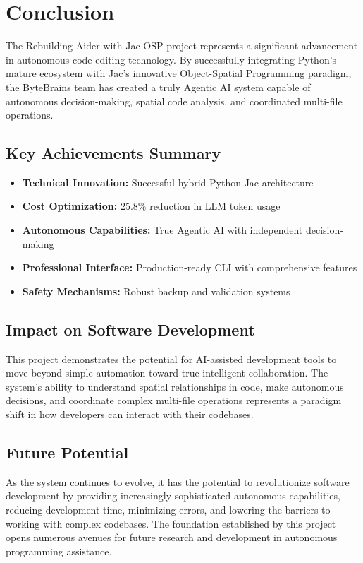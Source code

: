 \documentclass[12pt,a4paper]{article}
\begin{document}
\section{Conclusion}

The Rebuilding Aider with Jac-OSP project represents a significant advancement in autonomous code editing technology. By successfully integrating Python's mature ecosystem with Jac's innovative Object-Spatial Programming paradigm, the ByteBrains team has created a truly Agentic AI system capable of autonomous decision-making, spatial code analysis, and coordinated multi-file operations.

\subsection{Key Achievements Summary}
\begin{itemize}
    \item \textbf{Technical Innovation:} Successful hybrid Python-Jac architecture
    \item \textbf{Cost Optimization:} 25.8\% reduction in LLM token usage
    \item \textbf{Autonomous Capabilities:} True Agentic AI with independent decision-making
    \item \textbf{Professional Interface:} Production-ready CLI with comprehensive features
    \item \textbf{Safety Mechanisms:} Robust backup and validation systems
\end{itemize}

\subsection{Impact on Software Development}
This project demonstrates the potential for AI-assisted development tools to move beyond simple automation toward true intelligent collaboration. The system's ability to understand spatial relationships in code, make autonomous decisions, and coordinate complex multi-file operations represents a paradigm shift in how developers can interact with their codebases.

\subsection{Future Potential}
As the system continues to evolve, it has the potential to revolutionize software development by providing increasingly sophisticated autonomous capabilities, reducing development time, minimizing errors, and lowering the barriers to working with complex codebases. The foundation established by this project opens numerous avenues for future research and development in autonomous programming assistance.
\end{document}

